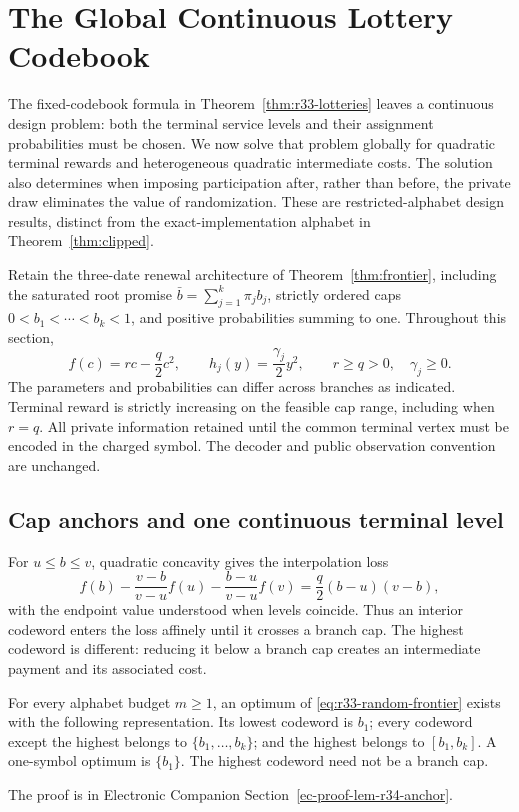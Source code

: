 \section{The Global Continuous Lottery Codebook}\label{sec:r34-global}
The fixed-codebook formula in Theorem~\ref{thm:r33-lotteries} leaves a continuous design problem: both the terminal service levels and their assignment probabilities must be chosen. We now solve that problem globally for quadratic terminal rewards and heterogeneous quadratic intermediate costs. The solution also determines when imposing participation after, rather than before, the private draw eliminates the value of randomization. These are restricted-alphabet design results, distinct from the exact-implementation alphabet in Theorem~\ref{thm:clipped}.

Retain the three-date renewal architecture of Theorem~\ref{thm:frontier}, including the saturated root promise $\bar b=\sum_{j=1}^k\pi_jb_j$, strictly ordered caps $0<b_1<\cdots<b_k<1$, and positive probabilities summing to one. Throughout this section,
\begin{equation}\label{eq:r34-primitives}
 f(c)=rc-\frac q2c^2,\qquad h_j(y)=\frac{\gamma_j}{2}y^2,
 \qquad r\geq q>0,\quad \gamma_j\geq0.
\end{equation}
The parameters and probabilities can differ across branches as indicated. Terminal reward is strictly increasing on the feasible cap range, including when $r=q$. All private information retained until the common terminal vertex must be encoded in the charged symbol. The decoder and public observation convention are unchanged.

\subsection{Cap anchors and one continuous terminal level}
For $u\leq b\leq v$, quadratic concavity gives the interpolation loss
\begin{equation}\label{eq:r34-chord}
 f(b)-\frac{v-b}{v-u}f(u)-\frac{b-u}{v-u}f(v)
 =\frac q2(b-u)(v-b),
\end{equation}
with the endpoint value understood when levels coincide. Thus an interior codeword enters the loss affinely until it crosses a branch cap. The highest codeword is different: reducing it below a branch cap creates an intermediate payment and its associated cost.

\begin{lemma}\label{lem:r34-anchor}
For every alphabet budget $m\geq1$, an optimum of \eqref{eq:r33-random-frontier} exists with the following representation. Its lowest codeword is $b_1$; every codeword except the highest belongs to $\{b_1,\ldots,b_k\}$; and the highest belongs to $[b_1,b_k]$. A one-symbol optimum is $\{b_1\}$. The highest codeword need not be a branch cap.
\end{lemma}
\noindent The proof is in Electronic Companion Section~\ref{ec-proof-lem-r34-anchor}.


